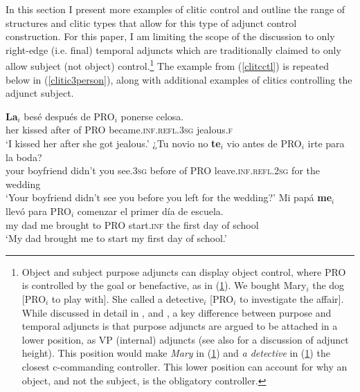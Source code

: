 \documentclass[output=paper,colorlinks,citecolor=brown]{langscibook}
\begin{document}
In this section I present more examples of clitic control and outline the range of structures and clitic types that allow for this type of adjunct control construction. For this paper, I am limiting the scope of the discussion to only right-edge (i.e. final) temporal adjuncts which are traditionally claimed to only allow subject (not object) control.\footnote{Object and subject purpose adjuncts can display object control, where PRO is controlled by the goal or benefactive, as in (\ref{a}).
\ea \label{a} {We bought Mary$_i$ the dog [PRO$_i$ to play with].}
\z
\ea \label{b} {She called a detective$_i$ [PRO$_i$ to investigate the affair].  }
\z
While discussed in detail in \citet{faraci1974aspects}, \citet{chomsky1980binding} and \citet{jones1991purpose}, a key difference between purpose and temporal adjuncts is that purpose adjuncts are argued to be attached in a lower position, as VP (internal) adjuncts (see also \citealt{green2019movement} for a discussion of adjunct height). This position would make \textit{Mary} in (\ref{a}) and \textit{a detective} in (\ref{b}) the closest c-commanding controller. This lower position can account for why an object, and not the subject, is the obligatory controller.} The example from (\ref{clitcctl}) is repeated below in (\ref{clitic3person}), along with additional examples of clitics controlling the adjunct subject.

\ea \label{clitcctl2}
\ea \label{clitic3person}
{
\gll \textbf{La$_{i}$} besé después de PRO$_{i}$ ponerse celosa.\\
her kissed after of PRO became.\textsc{inf.refl.3sg} jealous.\textsc{f}\\
\glt `I kissed her after she got jealous.'
}
\ex \label{clitic2person}
{
\gll ¿Tu novio no \textbf{te$_i$} vio antes de PRO$_i$ irte para la boda? \\
your boyfriend didn’t you see.\textsc{3sg} before of PRO leave.\textsc{inf.refl.2sg} for the wedding \\
\glt ‘Your boyfriend didn’t see you before you left for the wedding?’
}
\ex \label{clitic1person}
{
\gll Mi papá \textbf{me$_i$} llevó para PRO$_i$ comenzar el primer día de escuela.\\
my dad me brought to PRO start.\textsc{inf} the first day of school\\
\glt ‘My dad brought me to start my first day of school.’
}
\z
\z
\end{document}
